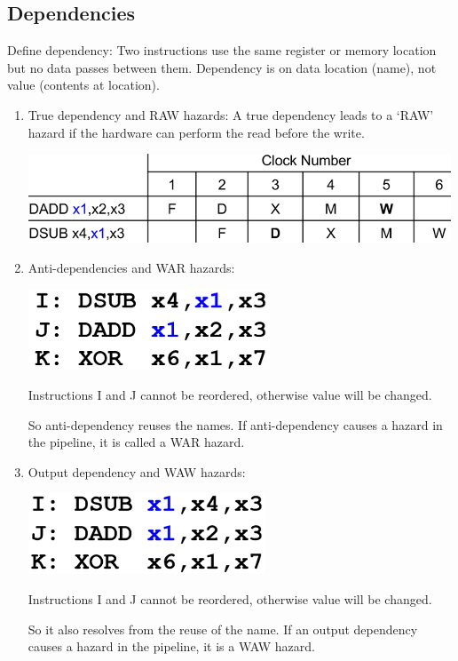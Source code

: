 \documentclass[letterpaper,12pt]{article}
\begin{document}
\subsection{Dependencies}
Define dependency: Two instructions use the same register or memory location but no data passes between them. Dependency is on data location (name), not value (contents at location).

\begin{enumerate}
    \item True dependency and RAW hazards:
          A true dependency leads to a `RAW' hazard if the hardware can perform the read before the write.

          \includegraphics*{./Image/true dependency example.png}

    \item Anti-dependencies and WAR hazards:

          \includegraphics*{./Image/Anti-dependency example.png}

          Instructions I and J cannot be reordered, otherwise value will be changed.

          So anti-dependency reuses the names. If anti-dependency causes a hazard in the pipeline, it is called a WAR hazard.

    \item Output dependency and WAW hazards:

          \includegraphics*{./Image/output dependency example.png}

          Instructions I and J cannot be reordered, otherwise value will be changed.

          So it also resolves from the reuse of the name. If an output dependency causes a hazard in the pipeline, it is a WAW hazard.
\end{enumerate}
\end{document}
